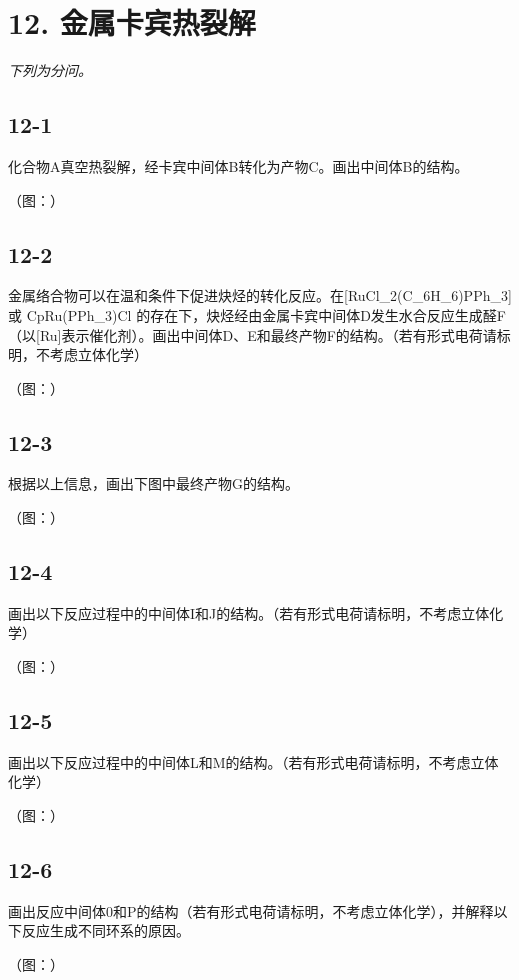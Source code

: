 \section*{12. 金属卡宾热裂解}
\textit{下列为分问。}

\subsection*{12-1}
化合物A真空热裂解，经卡宾中间体B转化为产物C。画出中间体B的结构。

（图：）

\subsection*{12-2}
⾦属络合物可以在温和条件下促进炔烃的转化反应。在[RuCl_{2}(C_{6}H_{6})PPh_{3}]或 CpRu(PPh_{3})Cl 的存在下，炔烃经由⾦属卡宾中间体D发⽣⽔合反应⽣成醛F（以[Ru]表⽰催化剂）。画出中间体D、E和最终产物F的结构。（若有形式电荷请标明，不考虑⽴体化学）

（图：）

\subsection*{12-3}
根据以上信息，画出下图中最终产物G的结构。

（图：）

\subsection*{12-4}
画出以下反应过程中的中间体I和J的结构。（若有形式电荷请标明，不考虑⽴体化学）

（图：）

\subsection*{12-5}
画出以下反应过程中的中间体L和M的结构。（若有形式电荷请标明，不考虑⽴体化学）

（图：）

\subsection*{12-6}
画出反应中间体0和P的结构（若有形式电荷请标明，不考虑立体化学），并解释以下反应生成不同环系的原因。

（图：）
